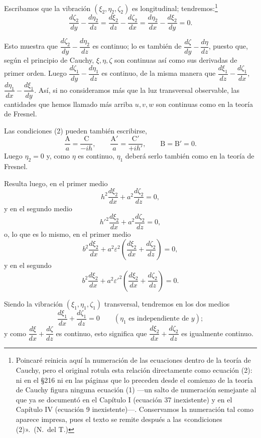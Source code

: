 Escribamos que la vibración $(\xi_2,\eta_2,\zeta_2)$ es longitudinal;
tendremos:\footnote{Poincaré reinicia aquí la numeración de las
ecuaciones dentro de la teoría de Cauchy, pero el original rotula esta
relación directamente como ecuación (2): ni en el §216 ni en las páginas
que lo preceden desde el comienzo de la teoría de Cauchy figura ninguna
ecuación (1) —un salto de numeración semejante al que ya se documentó en
el Capítulo I (ecuación 37 inexistente) y en el Capítulo IV (ecuación 9
inexistente)—. Conservamos la numeración tal como aparece impresa, pues
el texto se remite después a las «condiciones (2)».~(N.~del T.)}
\setcounter{equation}{1}
\begin{equation}
\frac{d\zeta_2}{dy}-\frac{d\eta_2}{dz}=\frac{d\xi_2}{dz}-\frac{d\zeta_2}{dx}
=\frac{d\eta_2}{dx}-\frac{d\xi_2}{dy}=0.
\end{equation}

Esto muestra que $\dfrac{d\zeta_2}{dy}-\dfrac{d\eta_2}{dz}$ es continuo;
lo es también de
$\dfrac{d\zeta}{dy}-\dfrac{d\eta}{dz}$, puesto que, según el principio de
Cauchy, $\xi,\eta,\zeta$ son continuas así como sus derivadas de primer
orden. Luego
$\dfrac{d\zeta_1}{dy}-\dfrac{d\eta_1}{dz}$ es continuo, de la misma manera
que $\dfrac{d\xi_1}{dz}-\dfrac{d\zeta_1}{dx}$,
$\dfrac{d\eta_1}{dx}-\dfrac{d\xi_1}{dy}$. Así, si no consideramos más que la
luz transversal observable, las cantidades que hemos llamado más arriba
$u,v,w$ son continuas como en la teoría de Fresnel.

Las condiciones (2) pueden también escribirse,
\[
\frac{\mathrm{A}}{a}=\frac{\mathrm{C}}{-ih},\qquad
\frac{\mathrm{A}'}{a}=\frac{\mathrm{C}'}{+ih'},\qquad
\mathrm{B}=\mathrm{B}'=0.
\]
Luego $\eta_2=0$ y, como $\eta$ es continuo, $\eta_1$ deberá serlo también
como en la teoría de Fresnel.

Resulta luego, en el primer medio
\[
h^2\frac{d\xi_2}{dx}+a^2\frac{d\zeta_2}{dz}=0,
\]
y en el segundo medio
\[
h'^2\frac{d\xi_2}{dx}+a^2\frac{d\zeta_2}{dz}=0,
\]
o, lo que es lo mismo, en el primer medio
\begin{equation}
b^2\frac{d\xi_2}{dx}+a^2\varepsilon^2\left(\frac{d\xi_2}{dx}+\frac{d\zeta_2}{dz}\right)=0,
\end{equation}
y en el segundo
\begin{equation}
b^2\frac{d\xi_2}{dx}+a^2\varepsilon'^2\left(\frac{d\xi_2}{dx}+\frac{d\zeta_2}{dz}\right)=0.
\end{equation}

Siendo la vibración $(\xi_1,\eta_1,\zeta_1)$ transversal, tendremos en los
dos medios
\[
\frac{d\xi_1}{dx}+\frac{d\zeta_1}{dz}=0 \qquad (\eta_1 \text{ es
independiente de } y);
\]
y como $\dfrac{d\xi}{dx}+\dfrac{d\zeta}{dz}$ es continuo, esto significa
que $\dfrac{d\xi_2}{dx}+\dfrac{d\zeta_2}{dz}$ es igualmente continuo.

